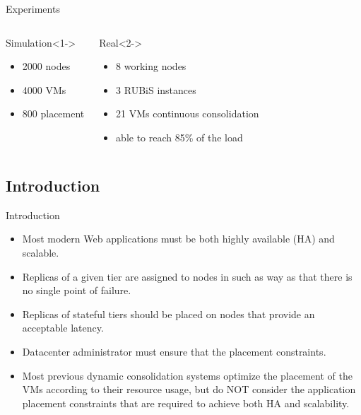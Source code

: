 

\begin{frame}{Experiments}

\begin{columns}[t]


\begin{block}{Simulation}<1->
\begin{itemize}
\item 2000 nodes 
\item 4000 VMs 
\item 800 placement
\end{itemize}
\end{block}


\begin{block}{Real}<2->
\begin{itemize}
\item 8 working nodes 
\item 3 RUBiS instances
\item 21 VMs continuous consolidation 
\item able to reach 85\% of the load 
\end{itemize}
\end{block}

\end{columns}

\end{frame}

\subsection{Introduction} 

\begin{frame}{Introduction}

\begin{itemize}
\item<1-> Most modern Web applications must be both \alert{highly available (HA)} 
and \alert{scalable}. 
\item<2-> Replicas of a given tier are assigned to nodes in such as way as that 
there is \alert{no single point of failure}. 
\item<3-> Replicas of stateful tiers should be placed on nodes that provide an 
\alert{acceptable latency}. 
\item<4-> Datacenter administrator must ensure that the \alert{placement constraints}.
\item<5-> Most previous dynamic consolidation systems optimize the placement of 
the VMs according to
their resource usage, but do \alert{NOT} consider the \alert{application 
placement constraints}
that are required to achieve both HA and scalability. 
\end{itemize}

\end{frame}

